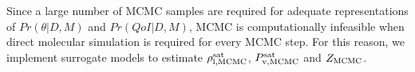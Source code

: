 \documentclass[journal=jctc,manuscript=article]{achemso}
\begin{document}





Since a large number of MCMC samples are required for adequate representations of $Pr(\theta|D,M)$ and $Pr(QoI|D,M)$, MCMC is computationally infeasible when direct molecular simulation is required for every MCMC step. For this reason, we implement surrogate models to estimate $\rho_{\rm l, MCMC}^{\rm sat}$, $P_{\rm v, MCMC}^{\rm sat}$ and $Z_{\rm MCMC}$. 

  
\end{document}
